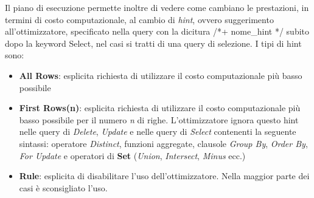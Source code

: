 Il piano di esecuzione permette inoltre di vedere come cambiano le prestazioni, in termini di costo computazionale, al cambio di \textit{hint}, ovvero suggerimento all'ottimizzatore, specificato nella query con la dicitura /*+ nome\_hint */ subito dopo la keyword Select, nel casi si tratti di una query di selezione. I tipi di hint sono:
\begin{itemize}
\item \textbf{All Rows}: esplicita richiesta di utilizzare il costo computazionale più basso possibile
\item \textbf{First Rows(n)}: esplicita richiesta di utilizzare il costo computazionale più basso possibile per il numero \textit{n} di righe. L'ottimizzatore ignora questo hint nelle query di \textit{Delete}, \textit{Update} e nelle query di \textit{Select} contenenti la seguente sintassi: operatore \textit{Distinct}, funzioni aggregate, clausole \textit{Group By}, \textit{Order By}, \textit{For Update} e operatori  di \textbf{Set} (\textit{Union}, \textit{Intersect}, \textit{Minus} ecc.)
\item \textbf{Rule}: esplicita di disabilitare l'uso dell'ottimizzatore. Nella maggior parte dei casi è sconsigliato l'uso.
\end{itemize}
